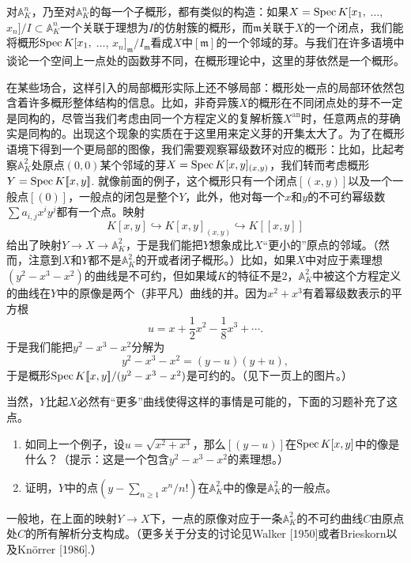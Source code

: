 对$\mathbb{A}_K^n$，乃至对$\mathbb{A}_K^n$的每一个子概形，都有类似的构造：如果$X=\operatorname{Spec} K[x_1,$ $\dots$, $x_n]/I\subset \mathbb{A}_K^n$一个关联于理想为$I$的仿射簇的概形，而$\mathfrak{m}$关联于$X$的一个闭点，我们能将概形$\operatorname{Spec} K[x_1,$ $\dots$, $x_n]_\mathfrak{m}/I_{\mathfrak{m}}$看成$X$中$[\mathfrak{m}]$的一个邻域的芽。与我们在许多语境中谈论一个空间上一点处的函数芽不同，在概形理论中，这里的芽依然是一个概形。

在某些场合，这样引入的局部概形实际上还不够局部：概形处一点的局部环依然包含着许多概形整体结构的信息。比如，非奇异簇$X$的概形在不同闭点处的芽不一定是同构的，尽管当我们考虑由同一个方程定义的复解析簇$X^{\text{an}}$时，任意两点的芽确实是同构的。出现这个现象的实质在于这里用来定义芽的开集太大了。为了在概形语境下得到一个更局部的图像，我们需要观察幂级数环对应的概形：比如，比起考察$\mathbb{A}_K^2$处原点$(0,0)$某个邻域的芽$X=\operatorname{Spec} K[x,y]_{(x,y)}$，我们转而考虑概形$Y=\operatorname{Spec} K [\![x,y]\!]$. 就像前面的例子，这个概形只有一个闭点$[(x,y)]$以及一个一般点$[(0)]$，一般点的闭包是整个$Y$，此外，他对每一个$x$和$y$的不可约幂级数$\sum a_{i,j}x^iy^j$都有一个点。映射
\[
	K[x,y]\hookrightarrow K[x,y]_{(x,y)}\hookrightarrow K[\![x,y]\!]
\]
给出了映射$Y\to X\to \mathbb{A}_K^2$，于是我们能把$Y$想象成比$X$“更小的”原点的邻域。（然而，注意到$X$和$Y$都不是$\mathbb{A}_K^2$的开或者闭子概形。）比如，如果$X$中对应于素理想$(y^2-x^3-x^2)$的曲线是不可约，但如果域$K$的特征不是$2$，$\mathbb{A}_K^2$中被这个方程定义的曲线在$Y$中的原像是两个（非平凡）曲线的并。因为$x^2+x^3$有着幂级数表示的平方根
\[
	u=x+\frac{1}{2}x^2-\frac{1}{8}x^3+\cdots.
\]
于是我们能把$y^2-x^3-x^2$分解为
\[
	y^2-x^3-x^2=(y-u)(y+u),
\]
于是概形$\operatorname{Spec}  K[\![x,y]\!]/(y^2-x^3-x^2)$是可约的。（见下一页上的图片。）


当然，$Y$比起$X$必然有“更多”曲线使得这样的事情是可能的，下面的习题补充了这点。

\begin{exe}
	\begin{enumerate}[{(a)}]\setlength{\itemsep}{0pt}
		\item 如同上一个例子，设$u=\sqrt{x^2+x^3}$，那么$[(y-u)]$在$\operatorname{Spec} K[x,y]$中的像是什么？（提示：这是一个包含$y^2-x^3-x^2$的素理想。）
		\item 证明，$Y$中的点$(y-\sum_{n\geq 1}x^n/n!)$在$\mathbb{A}_K^2$中的像是$\mathbb{A}_K^2$的一般点。
	\end{enumerate}
\end{exe}

一般地，在上面的映射$Y\to X$下，一点的原像对应于一条$\mathbb{A}_K^2$的不可约曲线$C$由原点处$C$的所有解析分支构成。（更多关于分支的讨论见Walker [1950]或者Brieskorn以及Kn\"{o}rrer [1986].）

